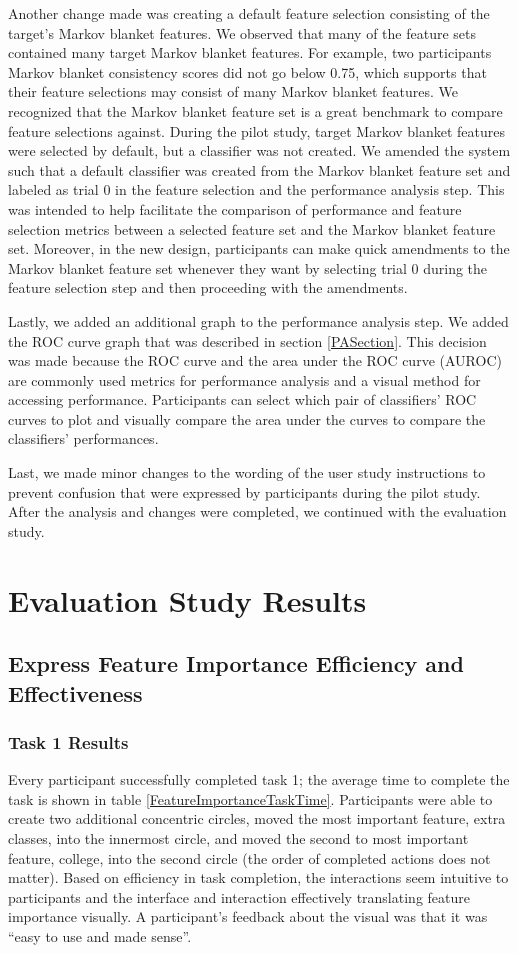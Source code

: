 Another change made was creating a default feature selection consisting of the target's Markov blanket features. We observed that many of the feature sets contained many target Markov blanket features. For example, two participants Markov blanket consistency scores did not go below 0.75, which supports that their feature selections may consist of many Markov blanket features. We recognized that the Markov blanket feature set is a great benchmark to compare feature selections against. During the pilot study, target Markov blanket features were selected by default, but a classifier was not created. We amended the system such that a default classifier was created from the Markov blanket feature set and labeled as trial 0 in the feature selection and the performance analysis step. This was intended to help facilitate the comparison of performance and feature selection metrics between a selected feature set and the Markov blanket feature set. Moreover, in the new design, participants can make quick amendments to the Markov blanket feature set whenever they want by selecting trial 0 during the feature selection step and then proceeding with the amendments.

Lastly, we added an additional graph to the performance analysis step. We added the ROC curve graph that was described in section \ref{PASection}. This decision was made because the ROC curve and the area under the ROC curve (AUROC) are commonly used metrics for performance analysis and a visual method for accessing performance. Participants can select which pair of classifiers' ROC curves to plot and visually compare the area under the curves to compare the classifiers' performances.

Last, we made minor changes to the wording of the user study instructions to prevent confusion that were expressed by participants during the pilot study. After the analysis and changes were completed, we continued with the evaluation study.

\section{Evaluation Study Results}
\subsection{ Express Feature Importance Efficiency and Effectiveness}
\subsubsection{ Task 1 Results}
Every participant successfully completed task 1; the average time to complete the task is shown in table \ref{FeatureImportanceTaskTime}. Participants were able to create two additional concentric circles, moved the most important feature, extra classes, into the innermost circle, and moved the second to most important feature, college, into the second circle (the order of completed actions does not matter). Based on efficiency in task completion, the interactions seem intuitive to participants and the interface and interaction effectively translating feature importance visually. A participant's feedback about the visual was that it was ``easy to use and made sense''.


